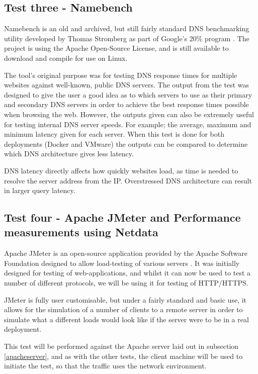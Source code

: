 \subsection{Test three - Namebench}
Namebench is an old and archived, but still fairly standard DNS benchmarking utility developed by Thomas Stromberg as part of Google's 20\% program \citep{Namebench}. The project is using the Apache Open-Source License, and is still available to download and compile for use on Linux.

The tool's original purpose was for testing DNS response times for multiple websites against well-known, public DNS servers. The output from the test was designed to give the user a good idea as to which servers to use as their primary and secondary DNS servers in order to achieve the best response times possible when browsing the web. However, the outputs given can also be extremely useful for testing internal DNS server speeds. For example; the average, maximum and minimum latency given for each server. When this test is done for both deployments (Docker and VMware) the outputs can be compared to determine which DNS architecture gives less latency.

DNS latency directly affects how quickly websites load, as time is needed to resolve the server address from the IP. Overstressed DNS architecture can result in larger query latency\citep{DNSlatency}.

\subsection{Test four - Apache JMeter and Performance measurements using Netdata}
Apache JMeter is an open-source application provided by the Apache Software Foundation designed to allow load-testing of various servers \citep{ApacheJMeter}. It was initially designed for testing of web-applications, and whilst it can now be used to test a number of different protocols, we will be using it for testing of HTTP/HTTPS.

JMeter is fully user customisable, but under a fairly standard and basic use, it allows for the simulation of a number of clients to a remote server in order to simulate what a different loads would look like if the server were to be in a real deployment\citep{masterjmeter}.

This test will be performed against the Apache server laid out in subsection \ref{apacheserver}, and as with the other tests, the client machine will be used to initiate the test, so that the traffic uses the network environment.


